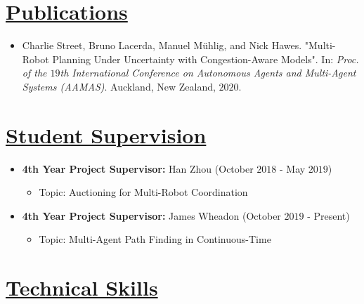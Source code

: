 \documentclass[11pt]{article}
\begin{document}
        \vspace{-20pt}
	\hspace{-100pt}\section*{\underline{Publications}}
	\begin{itemize}
	\item Charlie Street, Bruno Lacerda, Manuel M{\"u}hlig, and Nick Hawes. "Multi-Robot Planning Under Uncertainty with Congestion-Aware Models". In: \textit{Proc. of the $19$th International Conference on Autonomous Agents and Multi-Agent Systems (AAMAS)}. Auckland, New Zealand, $2020$.
	\end{itemize}
	
	\vspace{-20pt}
	\hspace{-100pt}\section*{\underline{Student Supervision}}
	\begin{itemize}
	\item \textbf{4th Year Project Supervisor:} Han Zhou (October $2018$ - May $2019$)
	    \begin{itemize}
	        \item Topic: Auctioning for Multi-Robot Coordination 
	    \end{itemize}
	\item \textbf{4th Year Project Supervisor:} James Wheadon (October $2019$ - Present)
	    \begin{itemize}
	        \item Topic: Multi-Agent Path Finding in Continuous-Time
	    \end{itemize}
	\end{itemize}
	
	\vspace{-20pt}
	\hspace{-100pt}\section*{\underline{Technical Skills}}
\end{document}
